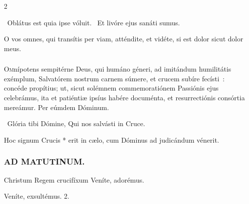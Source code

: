 \documentclass[9pt,twoside]{extarticle}
\begin{document}
\begin{multicols}{2}
\begin{tightlist}{}
\item {}~Oblátus est quia ipse vóluit. ~Et livóre ejus sanáti sumus.
\item {} O vos omnes, qui transítis per viam, atténdite, et vidéte, si est dolor sicut dolor meus.
\end{tightlist}

\subsubsection*{\center{}}
\lettrine{O}mnípotens sempitérne Deus, qui humáno géneri, ad imitándum humilitátis exémplum, Salvatórem nostrum carnem súmere, et crucem subíre fecísti~: concéde propítius; ut, sicut solémnem commemoratiónem Passiónis ejus celebrámus, ita et patiéntiæ ipsíus habére documénta, et resurrectiónis consórtia mereámur. Per eúmdem Dóminum.

\begin{tightlist}{}
\item {}~Glória tibi Dómine, Qui nos salvásti in Cruce.
\item {} Hoc signum Crucis * erit in cælo, cum Dóminus ad judicándum vénerit.
\end{tightlist}

\subsubsection*{\center \textsc{AD MATUTINUM.}}
\begin{tightlist}{}
\item {} Christum Regem crucifíxum \textred{*} Veníte, adorémus.
\item {} Veníte, exsultémus. 2. 
\end{tightlist}

\end{multicols}
\end{document}
